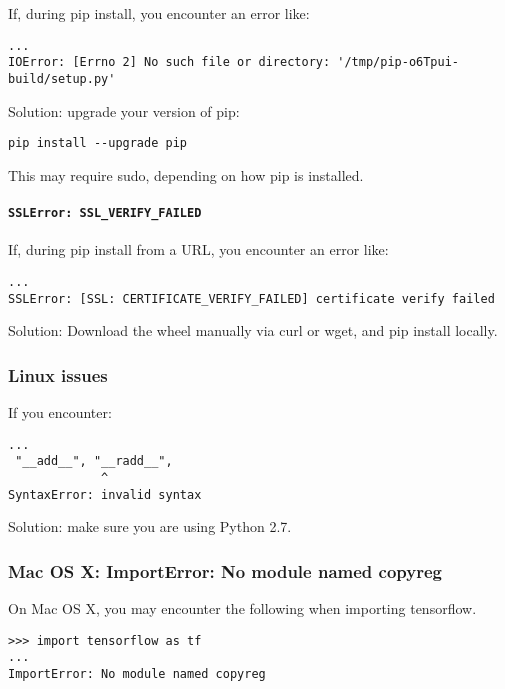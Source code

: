 If, during pip install, you encounter an error like:

\begin{lstlisting}
...
IOError: [Errno 2] No such file or directory: '/tmp/pip-o6Tpui-build/setup.py'
\end{lstlisting}

Solution: upgrade your version of pip:

\begin{lstlisting}
pip install --upgrade pip
\end{lstlisting}

This may require sudo, depending on how pip is installed.

\paragraph{\lstinline{SSLError: SSL_VERIFY_FAILED}}

If, during pip install from a URL, you encounter an error like:

\begin{lstlisting}
...
SSLError: [SSL: CERTIFICATE_VERIFY_FAILED] certificate verify failed
\end{lstlisting}

Solution: Download the wheel manually via curl or wget, and pip install locally.

\subsubsection {Linux issues}

If you encounter:

\begin{lstlisting}
...
 "__add__", "__radd__",
             ^
SyntaxError: invalid syntax
\end{lstlisting}

Solution: make sure you are using Python 2.7.

\subsubsection {Mac OS X: ImportError: No module named copyreg}

On Mac OS X, you may encounter the following when importing tensorflow.

\begin{lstlisting}
>>> import tensorflow as tf
...
ImportError: No module named copyreg
\end{lstlisting}

